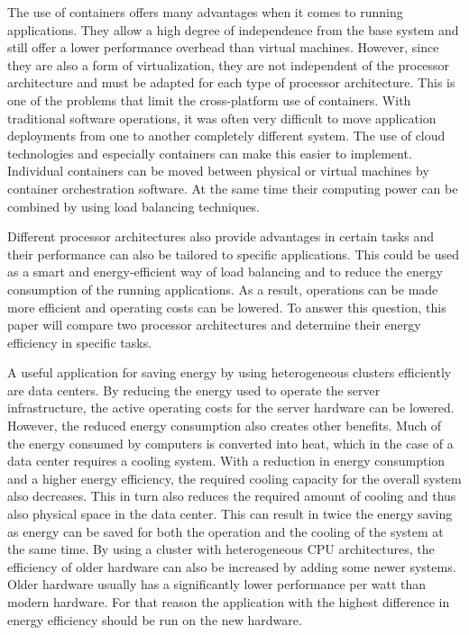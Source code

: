 The use of containers offers many advantages when it comes to running applications. 
They allow a high degree of independence from the base system and still offer a lower performance overhead than virtual machines. 
However, since they are also a form of virtualization, they are not independent of the processor architecture and must be adapted for each type of processor architecture. 
This is one of the problems that limit the cross-platform use of containers. 
With traditional software operations, it was often very difficult to move application deployments from one to another completely different system. The use of cloud technologies and especially containers can make this easier to implement. 
Individual containers can be moved between physical or virtual machines by container orchestration software.
At the same time their computing power can be combined by using load balancing techniques.


Different processor architectures also provide advantages in certain tasks and their performance can also be tailored to specific applications.
This could be used as a smart and energy-efficient way of load balancing and to reduce the energy consumption of the running applications. 
As a result, operations can be made more efficient and operating costs can be lowered. 
To answer this question, this paper will compare two processor architectures and determine their energy efficiency in specific tasks.



A useful application for saving energy by using heterogeneous clusters efficiently are data centers.
By reducing the energy used to operate the server infrastructure, the active operating costs for the server hardware can be lowered. 
However, the reduced energy consumption also creates other benefits. 
Much of the energy consumed by computers is converted into heat, which in the case of a data center requires a cooling system. 
With a reduction in energy consumption and a higher energy efficiency, the required cooling capacity for the overall system also decreases. 
This in turn also reduces the required amount of cooling and thus also physical space in the data center.
This can result in twice the energy saving as energy can be saved for both the operation and the cooling of the system at the same time.
By using a cluster with heterogeneous CPU architectures, the efficiency of older hardware can also be increased by adding some newer systems.
Older hardware usually has a significantly lower performance per watt than modern hardware.
For that reason the application with the highest difference in energy efficiency should be run on the new hardware.

